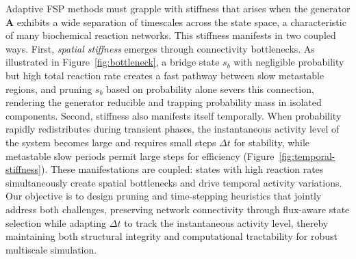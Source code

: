 \documentclass[onefignum,onetabnum]{siamart171218}
\begin{document}
\begin{remark}
\label{rem:stiffness-challenges}
Adaptive FSP methods must grapple with stiffness that arises when the generator $\mathbf{A}$ exhibits a wide separation of timescales across the state space, a characteristic of many biochemical reaction networks. This stiffness manifests in two coupled ways. First, \textit{spatial stiffness} emerges through connectivity bottlenecks. As illustrated in Figure~\ref{fig:bottleneck}, a bridge state $s_b$ with negligible probability but high total reaction rate creates a fast pathway between slow metastable regions, and pruning $s_b$ based on probability alone severs this connection, rendering the generator reducible and trapping probability mass in isolated components. Second, stiffness also manifests itself temporally. When probability rapidly redistributes during transient phases, the instantaneous activity level of the system becomes large and requires small steps $\Delta t$ for stability, while metastable slow periods permit large steps for efficiency (Figure~\ref{fig:temporal-stiffness}). These manifestations are coupled: states with high reaction rates simultaneously create spatial bottlenecks and drive temporal activity variations. Our objective is to design pruning and time-stepping heuristics that jointly address both challenges, preserving network connectivity through flux-aware state selection while adapting $\Delta t$ to track the instantaneous activity level, thereby maintaining both structural integrity and computational tractability for robust multiscale simulation.

\begin{figure}[ht!]
\centering

\begin{subfigure}[b]{0.46\textwidth}
\centering
{}
\end{subfigure}
\end{figure}
\end{remark}
\end{document}
